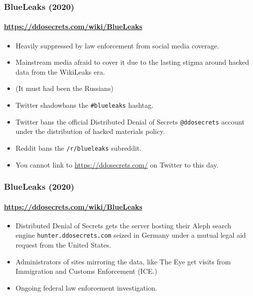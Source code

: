 \documentclass[aspectratio=169,usenames,dvipsnames]{beamer}
\begin{document}
\begin{frame}
  \frametitle{BlueLeaks (2020)}
  \framesubtitle{\url{https://ddosecrets.com/wiki/BlueLeaks}}

  \begin{itemize}[<+->]
    \item Heavily suppressed by law enforcement from social media coverage.
    \item Mainstream media afraid to cover it due to the lasting stigma around
      hacked data from the WikiLeaks era.
    \item (It must had been the Russians)
    \item Twitter shadowbans the \texttt{\#blueleaks} hashtag.
    \item Twitter bans the official Distributed Denial of Secrets
      \texttt{@ddosecrets} account under the distribution of hacked materials
      policy.
    \item Reddit bans the \texttt{/r/blueleaks} subreddit.
    \item You cannot link to \url{https://ddosecrets.com/} on Twitter to
      this day.
  \end{itemize}

\end{frame}

\begin{frame}
  \frametitle{BlueLeaks (2020)}
  \framesubtitle{\url{https://ddosecrets.com/wiki/BlueLeaks}}

  \begin{itemize}[<+->]
    \item Distributed Denial of Secrets gets the server hosting their Aleph
      search engine \texttt{hunter.ddosecrets.com} seized in Germany under
      a mutual legal aid request from the United States.
    \item Administrators of sites mirroring the data, like The Eye get visits
      from Immigration and Customs Enforcement (ICE.)
    \item Ongoing federal law enforcement investigation.
  \end{itemize}

\end{frame}
\end{document}

